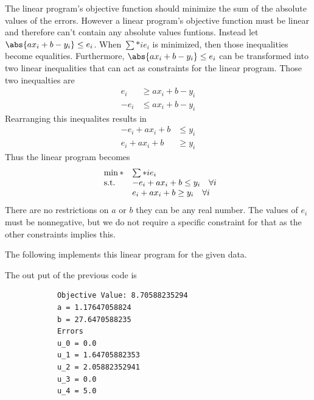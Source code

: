 \documentclass[11pt, oneside]{article}
\begin{document}
\begin{enumerate}
        The linear program's objective function should minimize the sum of the
        absolute values of the errors.
        However a linear program's objective function must be linear and
        therefore can't contain any absolute values funtions.
        Instead let $\abs{a x_i + b - y_i} \le e_i$. 
        When $\sum*{i}{}{e_i}$ is minimized, then those inequalities become
        equalities.
        Furthermore, $\abs{a x_i + b - y_i} \le e_i$ can be transformed into two
        linear inequalities that can act as constraints for the linear program.
        Those two inequalties are
        \begin{align*}
             e_i &\ge a x_i + b - y_i \\
            -e_i &\le a x_i + b - y_i
        \end{align*}
        Rearranging this inequalites results in
        \begin{align*}
            -e_i + a x_i + b &\le y_i \\
             e_i + a x_i + b &\ge y_i
        \end{align*}
        Thus the linear program becomes
        \[
            \begin{array}{ll@{}ll}
                \min* & \sum*{i}{}{e_i} \\
                \text{s.t.} & -e_i + a x_i + b \le y_i \quad \forall i \\
                            &  e_i + a x_i + b \ge y_i \quad \forall i
            \end{array}
        \]
        There are no restrictions on $a$ or $b$ they can be any real number.
        The values of $e_i$ must be nonnegative, but we do not require a
        specific constraint for that as the other constraints implies this.

        The following implements this linear program for the given data.
        

        The out put of the previous code is
        \begin{verbatim}
            Objective Value: 8.70588235294
            a = 1.17647058824
            b = 27.6470588235
            Errors
            u_0 = 0.0
            u_1 = 1.64705882353
            u_2 = 2.05882352941
            u_3 = 0.0
            u_4 = 5.0
        \end{verbatim}


\end{enumerate}
\end{document}
